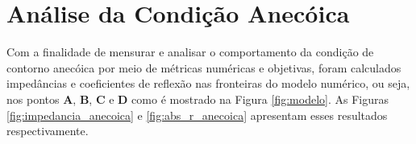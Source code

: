 \section{Análise da Condição Anecóica}

Com a finalidade de mensurar e analisar o comportamento da
 condição de contorno anecóica por meio de 
 métricas numéricas e objetivas, foram calculados 
 impedâncias e coeficientes de reflexão nas 
 fronteiras do modelo numérico, ou seja, 
 nos pontos \textbf{A}, \textbf{B}, \textbf{C} e \textbf{D} 
 como é mostrado na Figura \ref{fig:modelo}. 
 As Figuras \ref{fig:impedancia_anecoica} e \ref{fig:abs_r_anecoica}
 apresentam esses resultados respectivamente. 


\newcommand\scalexA{1}
\newcommand\scaleyA{1}
\newcommand\scalex{1}
\newcommand\scaley{1}
\newcommand\scaleA{0.5}

